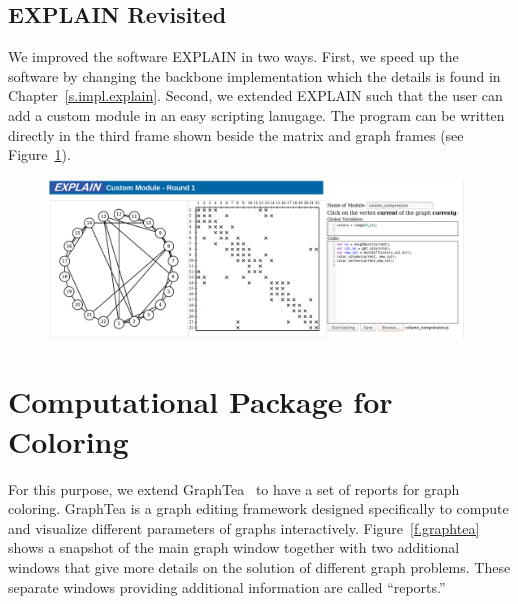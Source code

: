 \documentclass[12pt, oneside]{book}
\begin{document}
\section{EXPLAIN Revisited}
We improved the software EXPLAIN in two ways. 
First, we speed up the software by changing the backbone implementation
which the details is found in Chapter~\ref{s.impl.explain}.
Second, we extended EXPLAIN such that the user can add a custom module 
in an easy scripting lanugage. The program can be written directly 
in the third frame shown beside the matrix and graph frames
(see Figure~\ref{f.custom}).

\begin{figure}
\centering
\includegraphics[width=0.98\textwidth]{custom}
\caption{}
\label{f.custom}
\end{figure}

\chapter{Computational Package for Coloring}
\label{package}
For this purpose, we extend GraphTea~\cite{2014:07,2014:15,2014:16} to have a
set of reports for graph coloring.
GraphTea is a graph editing framework designed specifically to compute and visualize
different parameters of graphs interactively.
Figure~\ref{f.graphtea} shows a snapshot of the main
graph window together with two additional windows that give more details on the solution
of different graph problems. These separate windows providing additional information are
called ``reports.''
\end{document}
